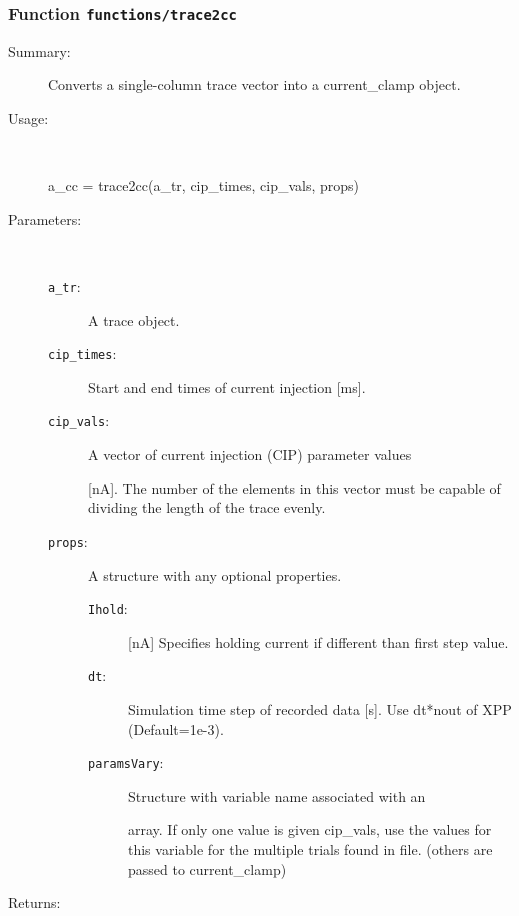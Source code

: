 \subsubsection[Function \texttt{trace2cc}]{Function \texttt{functions/trace2cc}}%
%
\label{ref_functions__trace2cc}%
\hypertarget{ref_functions__trace2cc}{}%
\begin{description}
\item[Summary:]Converts a single-column trace vector into a current\_clamp object.
%
\item[Usage:]~%
\begin{lyxcode}%
a\_cc = trace2cc(a\_tr, cip\_times, cip\_vals, props) 
%
\end{lyxcode}%
%
%
\item[Parameters:]~
\begin{description}%
\item[\texttt{a\_tr}:]
 A trace object.
\item[\texttt{cip\_times}:]
 Start and end times of current injection [ms].
\item[\texttt{cip\_vals}:]
 A vector of current injection (CIP) parameter values 

[nA]. The number of the elements in this vector must 
be capable of dividing the length of the trace evenly.
\item[\texttt{props}:]
 A structure with any optional properties.
\begin{description}%
\item[\texttt{Ihold}:]
 [nA] Specifies holding current if different than first step value.
\item[\texttt{dt}:]
 Simulation time step of recorded data [s]. Use dt*nout of XPP (Default=1e-3).
\item[\texttt{paramsVary}:]
 Structure with variable name associated with an

array. If only one value is given cip\_vals, use the
values for this variable for the multiple trials found in file.
(others are passed to current\_clamp)
\end{description}%
\end{description}%
%
\item[Returns:
]~


\end{description}
